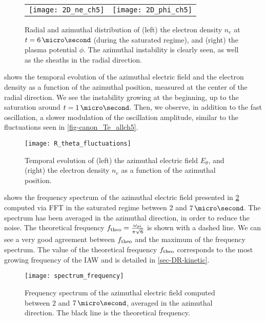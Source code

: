   \begin{figure}[hbtp]
    \centering
    \begin{tabular}{@{} c c @{}}
      \texttt{[image: 2D\_ne\_ch5]} &
      \texttt{[image: 2D\_phi\_ch5]} \\
    \end{tabular}
    \caption{Radial and azimuthal distribution of (left) the electron density $n_e$ at $t=6\,\micro\second$ (during the saturated regime), and (right) the plasma potential $\phi$. The azimuthal instability is clearly seen, as well as the sheaths in the radial direction. }
    \label{fig-2D_ne}
  \end{figure}
  
   shows the temporal evolution of the azimuthal electric field and the electron density as a function of the azimuthal position, measured at the center of the radial direction.
  We see the instability growing at the beginning, up to the saturation around $t=1\,\micro\second$.
  Then, we observe, in addition to the fast oscillation, a slower modulation of the oscillation amplitude, similar to the fluctuations seen in \cref{fig-canon_Te_allch5}.
  \begin{figure}[!hbt]
    \centering
    \texttt{[image: R\_theta\_fluctuations]}
    \caption{Temporal evolution of (left) the azimuthal electric field $E_{\theta}$, and (right) the electron density $n_e$ as a function of the azimuthal position.}
    \label{fig-2DcutEx}
  \end{figure}

   shows the frequency spectrum of the azimuthal electric field presented in \cref{fig-2DcutEx} computed via \ac{FFT} in the saturated regime between $2$ and $7\,\micro\second$.
  The spectrum has been averaged in the azimuthal direction, in order to reduce the noise.
  The theoretical frequency $f_{\rm theo} = \frac{\omega_{pi}}{\pi \sqrt{6} }$ \citep{croes2018} is shown with a dashed line. 
  We can see a very good agreement between $f_{\rm theo}$ and the maximum of the frequency spectrum.
  The value of the theoretical frequency $f_{\rm theo}$ corresponds to the most growing frequency of the \ac{IAW} and is detailed in \cref{sec-DR-kinetic}.
  \begin{figure}[!hbt]
    \centering
    \texttt{[image: spectrum\_frequency]}
    \caption{Frequency spectrum of the azimuthal electric field computed between $2$ and $7\,\micro\second$, averaged in the azimuthal direction. The black line is the theoretical frequency.}
    \label{fig-FFT_ex}
  \end{figure}
  
